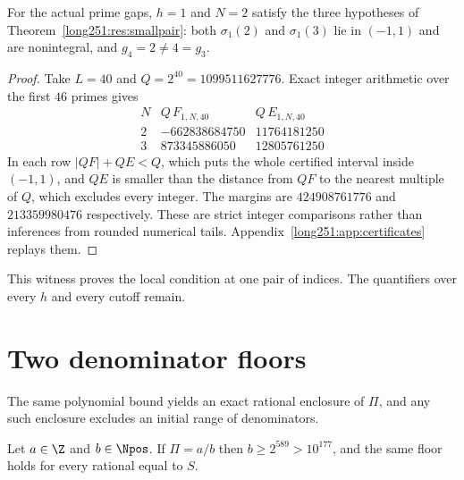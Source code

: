 \begin{proposition}\label{long251:res:finite-smallpair}
For the actual prime gaps, $h=1$ and $N=2$ satisfy the three hypotheses of
Theorem~\ref{long251:res:smallpair}: both $\sigma_1(2)$ and $\sigma_1(3)$ lie in
$(-1,1)$ and are nonintegral, and $g_4=2\ne4=g_3$.
\end{proposition}

\begin{proof}
Take $L=40$ and $Q=2^{40}=1099511627776$.  Exact integer arithmetic over the
first $46$ primes gives
\[
\begin{array}{c|r|r}
 N&Q\,F_{1,N,40}&Q\,E_{1,N,40}\\\hline
 2&-662838684750&11764181250\\
 3& 873345886050&12805761250
\end{array}
\]
In each row $|QF|+QE<Q$, which puts the whole certified interval inside
$(-1,1)$, and $QE$ is smaller than the distance from $QF$ to the nearest
multiple of $Q$, which excludes every integer.  The margins are $424908761776$
and $213359980476$ respectively.  These are strict integer comparisons rather
than inferences from rounded numerical tails.
Appendix~\ref{long251:app:certificates} replays them.
\end{proof}

This witness proves the local condition at one pair of indices.  The
quantifiers over every $h$ and every cutoff remain.

\section{Two denominator floors}\label{long251:sec:denominator-floor}

The same polynomial bound yields an exact rational enclosure of $\Pi$, and any
such enclosure excludes an initial range of denominators.

\begin{theorem}\label{long251:res:denominatorfloor}
Let $a\in\Z$ and $b\in\Npos$.  If $\Pi=a/b$ then $b\ge2^{589}>10^{177}$, and
the same floor holds for every rational equal to $S$.
\end{theorem}

